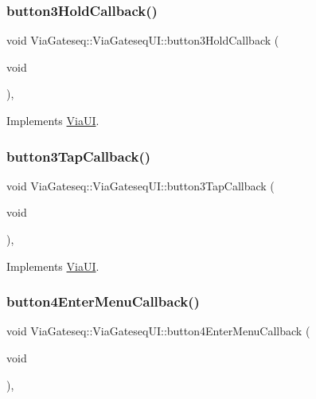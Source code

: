 \subsubsection{\texorpdfstring{button3\+Hold\+Callback()}{button3HoldCallback()}}
{\footnotesize\ttfamily void Via\+Gateseq\+::\+Via\+Gateseq\+U\+I\+::button3\+Hold\+Callback (\begin{DoxyParamCaption}\item[{void}]{ }\end{DoxyParamCaption})\hspace{0.3cm}{\ttfamily [override]}, {\ttfamily [virtual]}}



Implements \mbox{\hyperlink{class_via_u_i_a7334aea36cf78afac284dd5e899e8ace}{Via\+UI}}.

\mbox{\label{class_via_gateseq_1_1_via_gateseq_u_i_abce5bbab2316b9c0bc3cfedbaaeeef73}} 
\subsubsection{\texorpdfstring{button3\+Tap\+Callback()}{button3TapCallback()}}
{\footnotesize\ttfamily void Via\+Gateseq\+::\+Via\+Gateseq\+U\+I\+::button3\+Tap\+Callback (\begin{DoxyParamCaption}\item[{void}]{ }\end{DoxyParamCaption})\hspace{0.3cm}{\ttfamily [override]}, {\ttfamily [virtual]}}



Implements \mbox{\hyperlink{class_via_u_i_a3dfd40d901aaa8c8310bdbf75f4432a5}{Via\+UI}}.

\mbox{\label{class_via_gateseq_1_1_via_gateseq_u_i_a2f739b43b005baf5bc8dd4d081c5b6d5}} 
\subsubsection{\texorpdfstring{button4\+Enter\+Menu\+Callback()}{button4EnterMenuCallback()}}
{\footnotesize\ttfamily void Via\+Gateseq\+::\+Via\+Gateseq\+U\+I\+::button4\+Enter\+Menu\+Callback (\begin{DoxyParamCaption}\item[{void}]{ }\end{DoxyParamCaption})\hspace{0.3cm}{\ttfamily [override]}, {\ttfamily [virtual]}}



